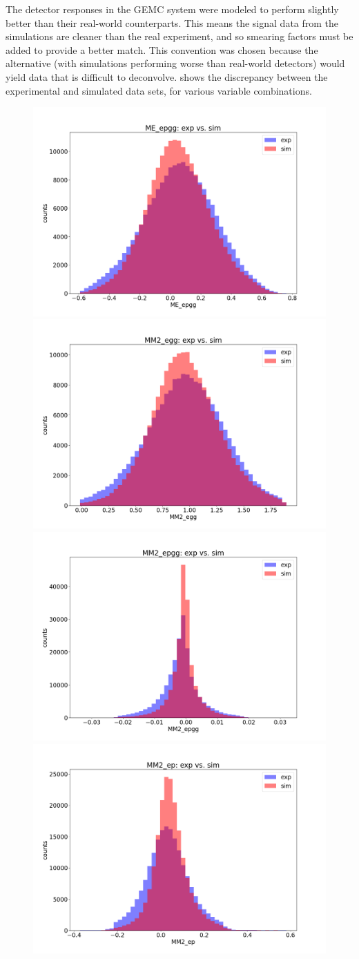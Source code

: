 
The detector responses in the GEMC system were modeled to perform slightly better than their real-world counterparts. This means the signal data from the simulations are cleaner than the real experiment, and so smearing factors must be added to provide a better match. This convention was chosen because the alternative (with simulations performing worse than real-world detectors) would yield data that is difficult to deconvolve.  shows the discrepancy between the experimental and simulated data sets, for various variable combinations. 

\begin{figure}[hbt]
	\centering
	\includegraphics[page=125,width=0.3\linewidth]{Chapters/Ch4-BaseAnalysis/0_preprocessing/0_B_simulation_data_preprocessing/pics/nosmear/outbending_rad_All_All_All_no_smearingME_epgg_exp_vs_sim.png}
	\includegraphics[page=123,width=0.3\linewidth]{Chapters/Ch4-BaseAnalysis/0_preprocessing/0_B_simulation_data_preprocessing/pics/nosmear/outbending_rad_All_All_All_no_smearingMM2_egg_exp_vs_sim.png}
	\includegraphics[page=128,width=0.3\linewidth]{Chapters/Ch4-BaseAnalysis/0_preprocessing/0_B_simulation_data_preprocessing/pics/nosmear/outbending_rad_All_All_All_no_smearingMM2_epgg_exp_vs_sim.png}
	\includegraphics[page=130,width=0.3\linewidth]{Chapters/Ch4-BaseAnalysis/0_preprocessing/0_B_simulation_data_preprocessing/pics/nosmear/outbending_rad_All_All_All_no_smearingMM2_ep_exp_vs_sim.png}

\end{figure}
